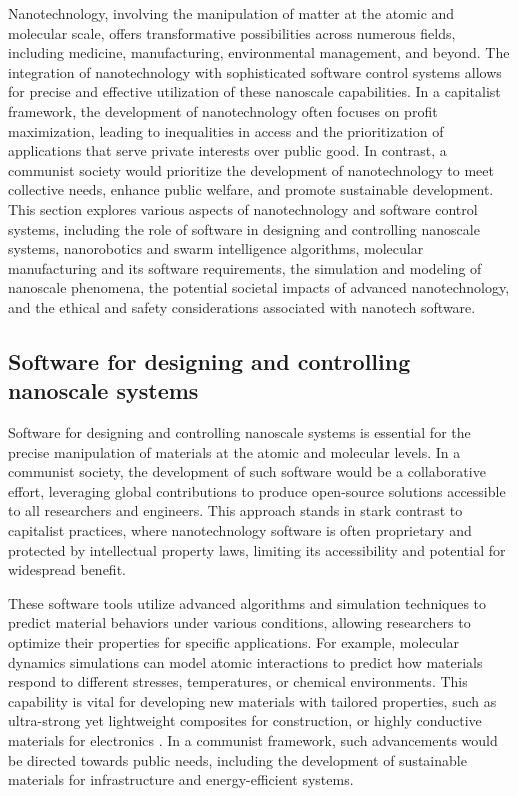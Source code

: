 Nanotechnology, involving the manipulation of matter at the atomic and molecular scale, offers transformative possibilities across numerous fields, including medicine, manufacturing, environmental management, and beyond. The integration of nanotechnology with sophisticated software control systems allows for precise and effective utilization of these nanoscale capabilities. In a capitalist framework, the development of nanotechnology often focuses on profit maximization, leading to inequalities in access and the prioritization of applications that serve private interests over public good. In contrast, a communist society would prioritize the development of nanotechnology to meet collective needs, enhance public welfare, and promote sustainable development. This section explores various aspects of nanotechnology and software control systems, including the role of software in designing and controlling nanoscale systems, nanorobotics and swarm intelligence algorithms, molecular manufacturing and its software requirements, the simulation and modeling of nanoscale phenomena, the potential societal impacts of advanced nanotechnology, and the ethical and safety considerations associated with nanotech software.

\subsection{Software for designing and controlling nanoscale systems}

Software for designing and controlling nanoscale systems is essential for the precise manipulation of materials at the atomic and molecular levels. In a communist society, the development of such software would be a collaborative effort, leveraging global contributions to produce open-source solutions accessible to all researchers and engineers. This approach stands in stark contrast to capitalist practices, where nanotechnology software is often proprietary and protected by intellectual property laws, limiting its accessibility and potential for widespread benefit.

These software tools utilize advanced algorithms and simulation techniques to predict material behaviors under various conditions, allowing researchers to optimize their properties for specific applications. For example, molecular dynamics simulations can model atomic interactions to predict how materials respond to different stresses, temperatures, or chemical environments. This capability is vital for developing new materials with tailored properties, such as ultra-strong yet lightweight composites for construction, or highly conductive materials for electronics \cite[pp.~45-52]{drexler1986engines}. In a communist framework, such advancements would be directed towards public needs, including the development of sustainable materials for infrastructure and energy-efficient systems.

